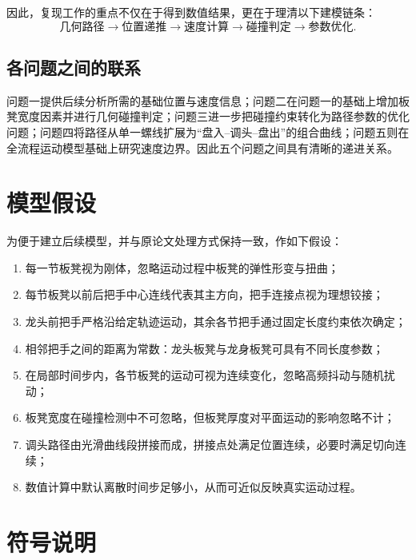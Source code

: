 \documentclass[12pt,a4paper]{ctexart}
\begin{document}
因此，复现工作的重点不仅在于得到数值结果，更在于理清以下建模链条：
\[
\text{几何路径} \longrightarrow \text{位置递推} \longrightarrow \text{速度计算}
\longrightarrow \text{碰撞判定} \longrightarrow \text{参数优化}.
\]

\subsection{各问题之间的联系}
问题一提供后续分析所需的基础位置与速度信息；问题二在问题一的基础上增加板凳宽度因素并进行几何碰撞判定；问题三进一步把碰撞约束转化为路径参数的优化问题；问题四将路径从单一螺线扩展为“盘入--调头--盘出”的组合曲线；问题五则在全流程运动模型基础上研究速度边界。因此五个问题之间具有清晰的递进关系。

\section{模型假设}

为便于建立后续模型，并与原论文处理方式保持一致，作如下假设：

\begin{enumerate}[label=\textbf{H\arabic*},leftmargin=2.5em]
    \item 每一节板凳视为刚体，忽略运动过程中板凳的弹性形变与扭曲；
    \item 每节板凳以前后把手中心连线代表其主方向，把手连接点视为理想铰接；
    \item 龙头前把手严格沿给定轨迹运动，其余各节把手通过固定长度约束依次确定；
    \item 相邻把手之间的距离为常数：龙头板凳与龙身板凳可具有不同长度参数；
    \item 在局部时间步内，各节板凳的运动可视为连续变化，忽略高频抖动与随机扰动；
    \item 板凳宽度在碰撞检测中不可忽略，但板凳厚度对平面运动的影响忽略不计；
    \item 调头路径由光滑曲线段拼接而成，拼接点处满足位置连续，必要时满足切向连续；
    \item 数值计算中默认离散时间步足够小，从而可近似反映真实运动过程。
\end{enumerate}

\section{符号说明}
\end{document}
